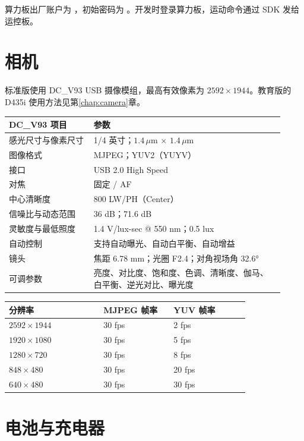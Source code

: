 算力板出厂账户为 ，初始密码为 。开发时登录算力板，运动命令通过 SDK 发给运控板。
\section{相机}
标准版使用 DC\_V93 USB 摄像模组，最高有效像素为 $2592\times1944$。教育版的 D435i 使用方法见第\ref{chap:camera}章。

\begingroup\small\renewcommand{\arraystretch}{1.15}
\begin{longtable}{@{}P{0.29\linewidth}P{0.63\linewidth}@{}}
\toprule
\textbf{DC\_V93 项目} & \textbf{参数} \\
\midrule\endhead
感光尺寸与像素尺寸 & 1/4 英寸；$1.4\,\mu$m $\times$ $1.4\,\mu$m \\
图像格式 & MJPEG；YUV2（YUYV） \\
接口 & USB 2.0 High Speed \\
对焦 & 固定 / AF \\
中心清晰度 & 800 LW/PH（Center） \\
信噪比与动态范围 & 36 dB；71.6 dB \\
灵敏度与最低照度 & 1.4 V/lux-sec @ 550 nm；0.5 lux \\
自动控制 & 支持自动曝光、自动白平衡、自动增益 \\
镜头 & 焦距 6.78 mm；光圈 F2.4；对角视场角 32.6° \\
可调参数 & 亮度、对比度、饱和度、色调、清晰度、伽马、白平衡、逆光对比、曝光度 \\
\bottomrule\end{longtable}\endgroup

\begingroup\small\renewcommand{\arraystretch}{1.15}
\begin{longtable}{@{}P{0.35\linewidth}P{0.26\linewidth}P{0.28\linewidth}@{}}
\toprule
\textbf{分辨率} & \textbf{MJPEG 帧率} & \textbf{YUV 帧率} \\
\midrule\endhead
$2592\times1944$ & 30 fps & 2 fps \\
$1920\times1080$ & 30 fps & 5 fps \\
$1280\times720$ & 30 fps & 8 fps \\
$848\times480$ & 30 fps & 20 fps \\
$640\times480$ & 30 fps & 30 fps \\
\bottomrule\end{longtable}\endgroup

\section{电池与充电器}

